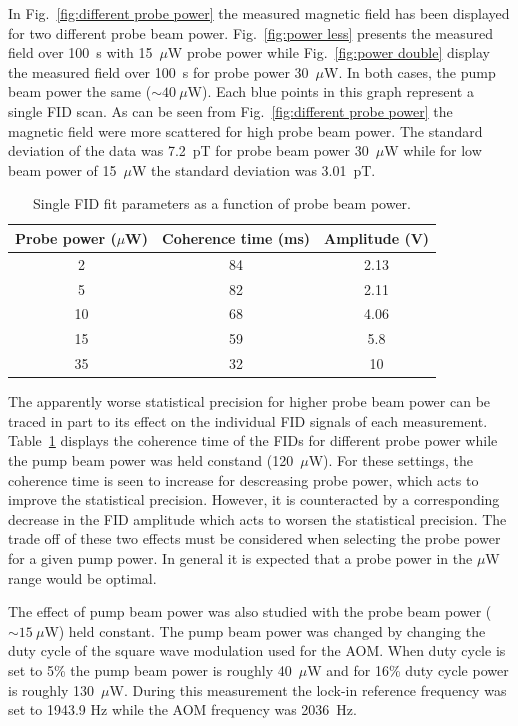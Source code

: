 In Fig.~\ref{fig:different probe power} the measured magnetic field
has been displayed for two different probe beam
power. Fig.~\ref{fig:power less} presents the measured field over
100~s with 15~$\mu$W probe power while Fig.~\ref{fig:power double}
display the measured field over 100~s for probe power 30~$\mu$W. In
both cases, the pump beam power the same ($\sim 40~\mu$W). Each blue
points in this graph represent a single FID scan. As can be seen from
Fig.~\ref{fig:different probe power} the magnetic field were more
scattered for high probe beam power.  The standard deviation of the
data was 7.2~pT for probe beam power 30~$\mu$W while for low beam
power of 15~$\mu$W the standard deviation was 3.01~pT.

\begin{table}%
\centering
\begin{tabular}{|c|c|c|}\hline
\textbf{Probe power ($\mu$W)}    & \textbf{Coherence time (ms)}  & \textbf{Amplitude (V)}\\\hline
2 & 84 & 2.13   \\
5    & 82 & 2.11  \\
10   &  68 & 4.06 \\
15  &   59 & 5.8  \\
35  &   32 & 10  \\\hline
\end{tabular}
\caption{Single FID fit parameters as a function of probe beam
  power.\label{tab:coh}}
\end{table}

The apparently worse statistical precision for higher probe beam power
can be traced in part to its effect on the individual FID signals of
each measurement.  Table~\ref{tab:coh} displays the coherence time of
the FIDs for different probe power while the pump beam power was held
constand (120~$\mu$W).  For these settings, the coherence time is seen
to increase for descreasing probe power, which acts to improve the
statistical precision.  However, it is counteracted by a corresponding
decrease in the FID amplitude which acts to worsen the statistical
precision.  The trade off of these two effects must be considered when
selecting the probe power for a given pump power.  In general it is
expected that a probe power in the $\mu$W range would be optimal.
 
The effect of pump beam power was also studied with the probe beam
power ($\sim 15~\mu$W) held constant.  The pump beam power was changed
by changing the duty cycle of the square wave modulation used for the
AOM.  When duty cycle is set to 5\% the pump beam power is roughly
40~$\mu$W and for 16\% duty cycle power is roughly 130~$\mu$W. During
this measurement the lock-in reference frequency was set to 1943.9 Hz
while the AOM frequency was 2036~Hz.

